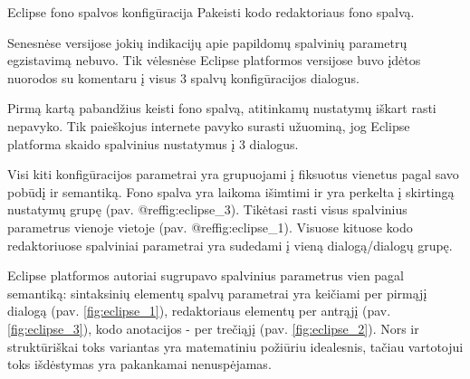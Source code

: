 \begin{xcase}{Eclipse fono spalvos konfigūracija}
  \xcgoal
  {
    Pakeisti kodo redaktoriaus fono spalvą.
  }
  
  \xctools
  {
    Senesnėse versijose jokių indikacijų apie papildomų spalvinių parametrų egzistavimą nebuvo.
    Tik vėlesnėse Eclipse platformos versijose buvo įdėtos nuorodos su komentaru į visus 3
    spalvų konfigūracijos dialogus.
  }
  
  \xcresult
  {
    Pirmą kartą pabandžius keisti fono spalvą, atitinkamų nustatymų iškart rasti nepavyko.
    Tik paieškojus internete pavyko surasti užuominą, jog Eclipse platforma skaido spalvinius
    nustatymus į 3 dialogus.
  }
  
  \xcprinciples
  {
    {
      Visi kiti konfigūracijos parametrai yra grupuojami į fiksuotus vienetus pagal savo pobūdį 
      ir semantiką.
    }
    {
      Fono spalva yra laikoma išimtimi ir yra perkelta į skirtingą nustatymų grupę (pav. @ref{fig:eclipse_3}).
    }
    {
      Tikėtasi rasti visus spalvinius parametrus vienoje vietoje (pav. @ref{fig:eclipse_1}).
      Visuose kituose kodo redaktoriuose spalviniai parametrai yra sudedami į vieną 
      dialogą/dialogų grupę.
    }
  }
  
  \xcthoughts
  {
    Eclipse platformos autoriai sugrupavo spalvinius parametrus vien pagal semantiką: 
    sintaksinių elementų spalvų parametrai yra keičiami per pirmąjį dialogą (pav. \ref{fig:eclipse_1}), redaktoriaus
    elementų per antrąjį (pav. \ref{fig:eclipse_3}), kodo anotacijos - per trečiąjį (pav. \ref{fig:eclipse_2}). Nors ir struktūriškai toks variantas
    yra matematiniu požiūriu idealesnis, tačiau vartotojui toks išdėstymas yra pakankamai
    nenuspėjamas.
  }
\end{xcase}
